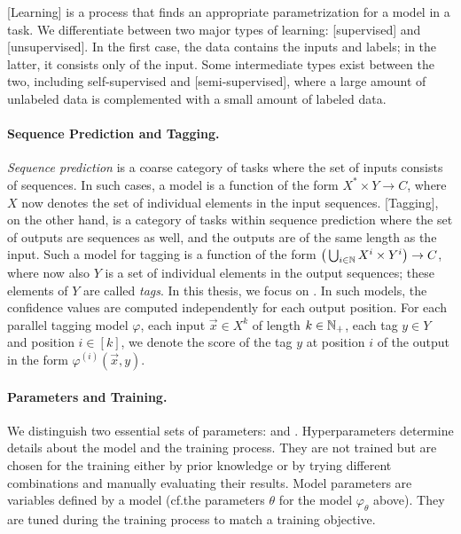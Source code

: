 \documentclass[../document.tex]{subfiles}
\begin{document}
    [Learning] is a process that finds an appropriate parametrization for a model in a task.
    We differentiate between two major types of learning: [supervised] and [unsupervised].
    In the first case, the data contains the inputs and labels; in the latter, it consists only of the input.
    Some intermediate types exist between the two, including self-supervised and [semi-supervised], where a large amount of unlabeled data is complemented with a small amount of labeled data.

    \paragraph{Sequence Prediction and Tagging.}
    \emph{Sequence prediction} is a coarse category of tasks where the set of inputs consists of sequences.
    In such cases, a model is a function of the form \(X^* \times Y \to C\), where \(X\) now denotes the set of individual elements in the input sequences.
    [Tagging], on the other hand, is a category of tasks within sequence prediction where the set of outputs are sequences as well, and the outputs are of the same length as the input.
    Such a model for tagging is a function of the form \(\big( \bigcup_{i \in \mathbb{N}} X^i \times Y^i \big) \to C\), where now also \(Y\) is a set of individual elements in the output sequences; these elements of \(Y\) are called \emph{tags}.
    In this thesis, we focus on .
    In such models, the confidence values are computed independently for each output position.
    For each parallel tagging model \(\varphi\), each input \(\vec{x} \in X^k\) of length \(k \in \mathbb{N}_+\), each tag \(y\in Y\) and position \(i \in [k]\), we denote the score of the tag \(y\) at position \(i\) of the output in the form \(\varphi^{(i)}(\vec{x}, y)\).

    \paragraph{Parameters and Training.}
    We distinguish two essential sets of parameters:  and .
    Hyperparameters determine details about the model and the training process. %
    They are not trained but are chosen for the training either by prior knowledge or by trying different combinations and manually evaluating their results.
    Model parameters are variables defined by a model (cf.\@ the parameters \(\theta\) for the model \(\varphi_{\theta}\) above). They are tuned during the training process to match a training objective.
\end{document}
